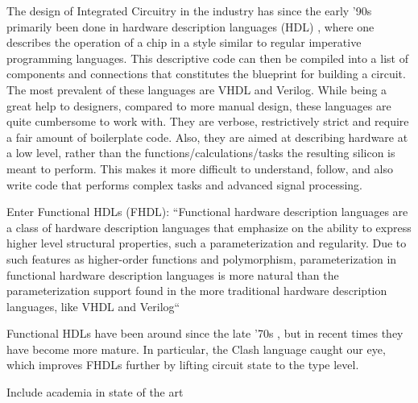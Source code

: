 The design of Integrated Circuitry in the industry has since the early '90s 
primarily been done in hardware description languages (HDL) \cite{ChenG}, 
where one describes the operation of a chip in a style similar to regular 
imperative programming languages. This descriptive code can then be compiled 
into a list of components and connections that constitutes the blueprint for 
building a circuit. The most prevalent of these languages are VHDL and 
Verilog. While being a great help to designers, compared to more manual 
design, these languages are quite cumbersome to work with. They are verbose, 
restrictively strict and require a fair amount of boilerplate code. Also, 
they are aimed at describing hardware at a low level, rather than the 
functions/calculations/tasks the resulting silicon is meant to perform. This 
makes it more difficult to understand, follow, and also write code that 
performs complex tasks and advanced signal processing.

Enter Functional HDLs (FHDL): 
``Functional hardware description languages are a class of hardware description languages that emphasize on the ability to express higher level structural properties, such a parameterization and regularity.  Due to such features as higher-order functions and polymorphism, parameterization in functional hardware description languages is more natural than the parameterization support found in the more traditional hardware description languages, like VHDL and Verilog`` \cite{Baaij}

Functional HDLs have been around since the late '70s \cite{ChenG}, but in 
recent times they have become more mature. In particular, the Clash language
caught our eye, which improves FHDLs further by lifting circuit state to the 
type level.

Include academia in state of the art
